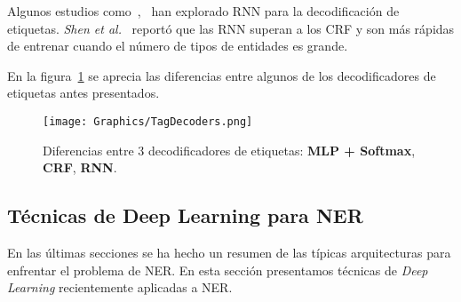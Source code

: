 Algunos estudios como~\cite{zheng2017joint},~\cite{vaswani2016supertagging} han explorado RNN para la decodificaci\'on de etiquetas. \emph{Shen et al.}~\cite{shen2017deep} report\'o que las RNN superan a los CRF y son m\'as r\'apidas de entrenar cuando el n\'umero de tipos de entidades es grande.


En la figura~\ref{fig:tagDec} se aprecia las diferencias entre algunos de los decodificadores de etiquetas antes presentados.

\begin{figure}[h!]
	\centering
	\texttt{[image: Graphics/TagDecoders.png]}
	\caption{Diferencias entre 3 decodificadores de etiquetas: \textbf{MLP + Softmax}, \textbf{CRF}, \textbf{RNN}.}\label{fig:tagDec}
\end{figure}


\subsection{T\'ecnicas de Deep Learning para NER}
En las \'ultimas secciones se ha hecho un resumen de las t\'ipicas arquitecturas para enfrentar el problema de NER. En esta secci\'on presentamos t\'ecnicas de \emph{Deep Learning} recientemente aplicadas a NER.

